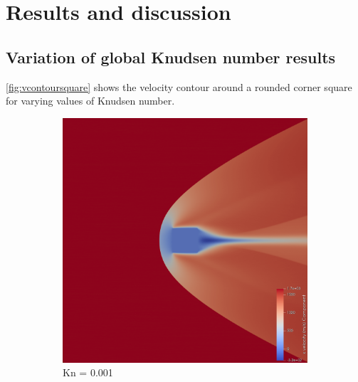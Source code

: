 \section{Results and discussion}
\label{section:4}

\subsection{Variation of global Knudsen number results}
\label{subsection:kn}

\autoref{fig:vcontoursquare} shows the velocity contour around a rounded corner square for varying values of Knudsen number.
\begin{figure}
    \centering
    \begin{subfigure}{0.32\textwidth}
        \centering
        \includegraphics[width=\textwidth]{Images/4. Results/Square Kn/pv/Kn0.001.png}
        \caption{Kn = 0.001}
    \end{subfigure}
    \hfill
    \begin{subfigure}{0.32\textwidth}
        \centering

\end{subfigure}
\end{figure}
